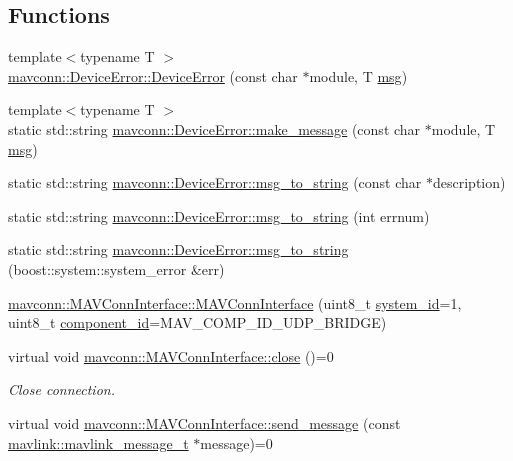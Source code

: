 \subsection*{Functions}
\begin{DoxyCompactItemize}
\item 
{\footnotesize template$<$typename T $>$ }\\\mbox{\hyperlink{group__mavconn_ga686d0d40b10a4d013dc09de32a43efaa}{mavconn\+::\+Device\+Error\+::\+Device\+Error}} (const char $\ast$module, T \mbox{\hyperlink{stratnode_8cpp_a82cfe4ed9bc9e1b07c8bf209c324d85b}{msg}})
\item 
{\footnotesize template$<$typename T $>$ }\\static std\+::string \mbox{\hyperlink{group__mavconn_ga76a9378a9bfc4f2b6f1b9c3ecb00ec9a}{mavconn\+::\+Device\+Error\+::make\+\_\+message}} (const char $\ast$module, T \mbox{\hyperlink{stratnode_8cpp_a82cfe4ed9bc9e1b07c8bf209c324d85b}{msg}})
\item 
static std\+::string \mbox{\hyperlink{group__mavconn_gae998ec92e731b23abc43286b88fa84ca}{mavconn\+::\+Device\+Error\+::msg\+\_\+to\+\_\+string}} (const char $\ast$description)
\item 
static std\+::string \mbox{\hyperlink{group__mavconn_ga0422d27d75fd22d67cc678d9b92f9d95}{mavconn\+::\+Device\+Error\+::msg\+\_\+to\+\_\+string}} (int errnum)
\item 
static std\+::string \mbox{\hyperlink{group__mavconn_ga1a6103f0af6a0a451ae5af0ba190a50d}{mavconn\+::\+Device\+Error\+::msg\+\_\+to\+\_\+string}} (boost\+::system\+::system\+\_\+error \&err)
\item 
\mbox{\hyperlink{group__mavconn_ga9b64f95099f1be0b41ae1dd459db63bc}{mavconn\+::\+M\+A\+V\+Conn\+Interface\+::\+M\+A\+V\+Conn\+Interface}} (uint8\+\_\+t \mbox{\hyperlink{setHome_8cpp_a83150acb88d810ae6864b4c125324ed6}{system\+\_\+id}}=1, uint8\+\_\+t \mbox{\hyperlink{setHome_8cpp_adc84285d5da2c4fa9721d0a32d5e41a7}{component\+\_\+id}}=M\+A\+V\+\_\+\+C\+O\+M\+P\+\_\+\+I\+D\+\_\+\+U\+D\+P\+\_\+\+B\+R\+I\+D\+GE)
\item 
virtual void \mbox{\hyperlink{group__mavconn_ga7c1a5a89489e345a6621c327107293d8}{mavconn\+::\+M\+A\+V\+Conn\+Interface\+::close}} ()=0
\begin{DoxyCompactList}\small\item\em Close connection. \end{DoxyCompactList}\item 
virtual void \mbox{\hyperlink{group__mavconn_gad807cf7e1935548e0c7ba94943cbb7aa}{mavconn\+::\+M\+A\+V\+Conn\+Interface\+::send\+\_\+message}} (const \mbox{\hyperlink{include__v0_89_2mavlink__types_8h_a63b963764c09dc72f4910c1521e325b9}{mavlink\+::mavlink\+\_\+message\+\_\+t}} $\ast$message)=0

\end{DoxyCompactItemize}
